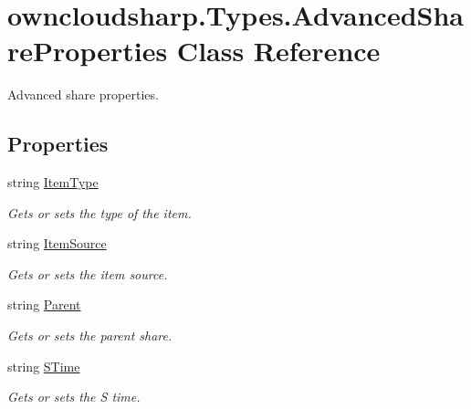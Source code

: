 \hypertarget{classowncloudsharp_1_1_types_1_1_advanced_share_properties}{}\section{owncloudsharp.\+Types.\+Advanced\+Share\+Properties Class Reference}
\label{classowncloudsharp_1_1_types_1_1_advanced_share_properties}


Advanced share properties.  


\subsection*{Properties}
\begin{DoxyCompactItemize}
\item 
string \hyperlink{classowncloudsharp_1_1_types_1_1_advanced_share_properties_a27befd7724a4772825dc9f6c1edf43c1}{Item\+Type}
\begin{DoxyCompactList}\small\item\em Gets or sets the type of the item. \end{DoxyCompactList}\item 
string \hyperlink{classowncloudsharp_1_1_types_1_1_advanced_share_properties_a6372a722cd53c858a4d4b4871ce7f14c}{Item\+Source}
\begin{DoxyCompactList}\small\item\em Gets or sets the item source. \end{DoxyCompactList}\item 
string \hyperlink{classowncloudsharp_1_1_types_1_1_advanced_share_properties_a893d3b751d049690c57a5d409d6566be}{Parent}
\begin{DoxyCompactList}\small\item\em Gets or sets the parent share. \end{DoxyCompactList}\item 
string \hyperlink{classowncloudsharp_1_1_types_1_1_advanced_share_properties_ac0b2869e60caefc6e067b04dff2d406a}{S\+Time}
\begin{DoxyCompactList}\small\item\em Gets or sets the S time. \end{DoxyCompactList}\item 

\end{DoxyCompactItemize}

